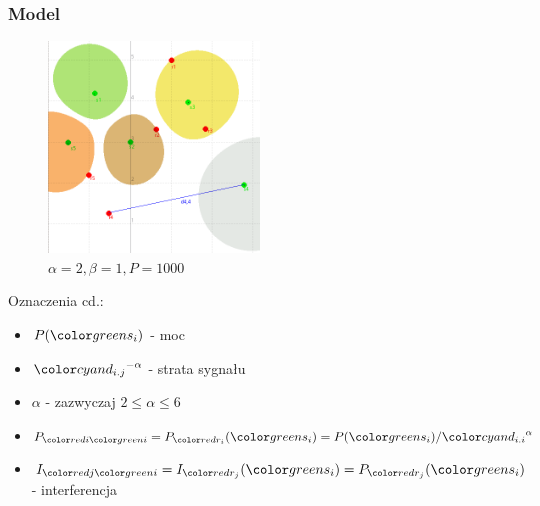 \documentclass[polish, t,10pt]{beamer}
\begin{document}
    \begin{frame}
        \frametitle{Model}
        \begin{figure}
            \includegraphics[width=0.5\textwidth]{pictures/model-diagram1.png}
            \caption{$\alpha=2, \beta=1, P=1000$}
        \end{figure}
        Oznaczenia cd.:
        \begin{itemize}
            \item $P(\si)$ - moc
            \item $\dij^{-\alpha}$ - strata sygnału
            \item $\alpha$ - zazwyczaj $2 \le \alpha \leq 6$
            \item $P_{\rri\ggi} = P_{\ri}(\si) = P(\si) / \dii^\alpha$
            \item $I_{\rrj\ggi} = I_{\rj}(\si) = P_{\rj}(\si)$ - interferencja
        \end{itemize}
    \end{frame}
\end{document}
